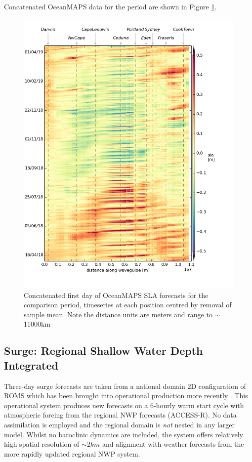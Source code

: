 Concatenated OceanMAPS data for the period are shown in Figure \ref{fig:hov_eg}. 
\begin{figure}[H]\centering
    \noindent\includegraphics[width=\figwidthFull]{figures/plots/concat_sla_day0_full.png}
    \caption[Concatenated first day of OceanMAPS SLA forecasts] 
            {Concatenated first day of OceanMAPS SLA forecasts for the comparison period, 
             timeseries at each position centred by removal of sample mean. Note the distance units are meters and range to $\sim$11000km}
    \label{fig:hov_eg}
\end{figure} 

\subsection{Surge: Regional Shallow Water Depth Integrated  }
\label{sec:roms}
Three-day surge forecasts are taken from a national domain 2D configuration of ROMS \citep{Shchepetkin:2005eh} which has been brought into operational production more recently \citep{Allen:2018aa}.  
This operational system produces new forecasts on a 6-hourly warm start cycle with atmospheric forcing from the regional NWP forecasts (ACCESS-R).
No data assimilation is employed and the regional domain is \emph{not} nested in any larger model.
Whilst no baroclinic dynamics are included, the system offers relatively high spatial resolution of $\sim2km$ and alignment with weather forecasts from the more rapidly updated regional NWP system.


